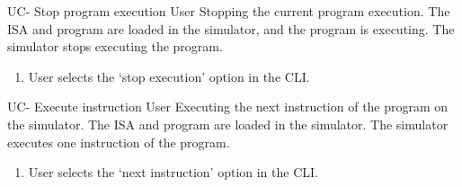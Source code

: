 \begin{useCase}{UC-}
  {Stop program execution}  %
  {User}  %
  {Stopping the current program execution.}  %
  {The \gls{ISA} and program are loaded in the simulator, and the program is executing.}  %
  {The simulator stops executing the program.}  %
  \begin{enumerate}[nosep]  %
    \item User selects the `stop execution' option in the \gls{CLI}.
  \end{enumerate}
\end{useCase}

\begin{useCase}{UC-}
  {Execute instruction}  %
  {User}  %
  {Executing the next instruction of the program on the simulator.}  %
  {The \gls{ISA} and program are loaded in the simulator.}  %
  {The simulator executes one instruction of the program.}  %
  \begin{enumerate}[nosep]  %
    \item User selects the `next instruction' option in the \gls{CLI}.
  \end{enumerate}
\end{useCase}

